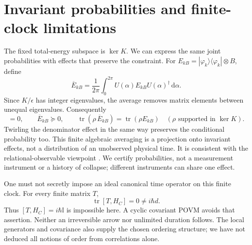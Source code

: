 \documentclass[11pt,a4paper]{article}
\newcommand{\dd}{\mathrm d}
\newcommand{\id}{\mathbb I}
\newcommand{\tr}{\operatorname{tr}}
\newcommand{\ket}[1]{|#1\rangle}
\newcommand{\bra}[1]{\langle#1|}
\begin{document}
\newpage
\section{Invariant probabilities and finite-clock limitations}
The fixed total-energy subspace is $\ker K$. We can express the same
joint probabilities with effects that preserve the constraint. For
$E_{kB}=\ket{\varphi_k}\bra{\varphi_k}\otimes B$, define
\begin{equation}
 \overline E_{kB}=\frac1{2\pi}\int_0^{2\pi}
        U(\alpha)E_{kB}U(\alpha)^\dagger\,\dd\alpha .
\end{equation}
Since $K/\epsilon$ has integer eigenvalues, the average removes matrix
elements between unequal eigenvalues. Consequently
\begin{equation}
 [K,\overline E_{kB}]=0,\qquad
 \overline E_{kB}\succeq0,\qquad
 \tr(\rho\,\overline E_{kB})=\tr(\rho E_{kB})
       \quad(\rho\text{ supported in }\ker K).
\end{equation}
Twirling the denominator effect in the same way preserves the
conditional probability too. This finite algebraic averaging is a
projection onto invariant effects, not a distribution of an unobserved
physical time. It is consistent with the relational-observable viewpoint
\cite{trinity}. We certify probabilities, not a measurement instrument
or a history of collapse; different instruments can share one effect.

One must not secretly impose an ideal canonical time operator on this
finite clock. For every finite matrix $T$,
\begin{equation}
 \tr[T,H_C]=0\ne i\hbar d .
\end{equation}
Thus $[T,H_C]=i\hbar\id$ is impossible here. A cyclic covariant POVM
avoids that assertion. Neither an irreversible arrow nor unlimited
duration follows. The local generators and covariance also supply the
chosen ordering structure; we have not deduced all notions of order
from correlations alone.
\end{document}
